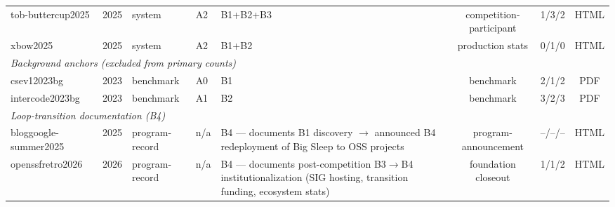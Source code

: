 \documentclass[conference,compsoc]{IEEEtran}
\begin{document}
\begin{table}[!ht]
{\begin{tabular}{@{}lllllccc@{}}
tob-buttercup2025 & 2025 & system & A2 & B1+B2+B3 & competition-participant & 1/3/2 & HTML\\
xbow2025 & 2025 & system & A2 & B1+B2 & production stats & 0/1/0 & HTML\\
\midrule
\multicolumn{8}{l}{\emph{Background anchors (excluded from primary counts)}}\\
csev12023bg & 2023 & benchmark & A0 & B1 & benchmark & 2/1/2 & PDF\\
intercode2023bg & 2023 & benchmark & A1 & B2 & benchmark & 3/2/3 & PDF\\
\midrule
\multicolumn{8}{l}{\emph{Loop-transition documentation (B4)}}\\
bloggoogle-summer2025 & 2025 & program-record & n/a & B4 — documents B1 discovery $\to$ announced B4 redeployment of Big Sleep to OSS projects & program-announcement & --/--/-- & HTML\\
openssfretro2026 & 2026 & program-record & n/a & B4 — documents post-competition B3$\to$B4 institutionalization (SIG hosting, transition funding, ecosystem stats) & foundation closeout & 1/1/2 & HTML\\
\bottomrule
\end{tabular}}
\end{table}
\end{document}
